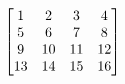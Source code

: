 \documentclass[preview]{standalone}
\begin{document}
\begin{align*}
\special{dvisvgm:raw <g id='unique000'>}\begin{bmatrix}1 & 2 & 3 & 4\\5 & 6 & 7 & 8\\9 & 10 & 11 & 12\\13 & 14 & 15 & 16\end{bmatrix}\special{dvisvgm:raw </g>}
\end{align*}
\end{document}
